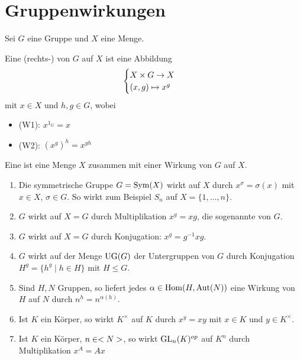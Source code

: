 \section{Gruppenwirkungen}

Sei $G$ eine Gruppe und $X$ eine Menge.

\begin{definition}
	Eine (rechts-) von $G$ auf $X$ ist eine Abbildung
	\begin{align}
		\begin{cases}
			X\times G\to X \\ (x,g)\mapsto x^g
		\end{cases}\notag
	\end{align}
	mit $x\in X$ und $h,g\in G$, wobei
	\begin{itemize}
		\item (W1): $x^{1_G}=x$
		\item (W2): $(x^g)^h=x^{gh}$
	\end{itemize}
	Eine  ist eine Menge $X$ zusammen mit einer Wirkung von $G$ auf $X$.
\end{definition}

\begin{example}
	\begin{enumerate}[label=(\alph*)]
		\item Die symmetrische Gruppe $G=\operatorname{Sym}(X)$ wirkt auf $X$ durch $x^\sigma=\sigma(x)$ mit $x\in X$, $\sigma\in G$. So wirkt zum Beispiel $S_n$ auf $X=\{1,...,n\}$.
		\item $G$ wirkt auf $X=G$ durch Multiplikation $x^g=xg$, die sogenannte  von $G$.
		\item $G$ wirkt auf $X=G$ durch Konjugation: $x^g=g^{-1}xg$.
		\item $G$ wirkt auf der Menge $\operatorname{UG}(G)$ der Untergruppen von $G$ durch Konjugation $H^g=\{h^g\mid h\in H\}$ mit $H\le G$.
		\item Sind $H,N$ Gruppen, so liefert jedes $\alpha\in\operatorname{Hom}(H,\operatorname{Aut}(N))$ eine Wirkung von $H$ auf $N$ durch $n^h=n^{\alpha(h)}$.
		\item Ist $K$ ein Körper, so wirkt $K^\times$ auf $K$ durch $x^y=xy$ mit $x\in K$ und $y\in K^\times$.
		\item Ist $K$ ein Körper, $n\in<N>$, so wirkt $\operatorname{GL}_n(K)^{op}$ auf $K^n$ durch Multiplikation $x^A=Ax$
	\end{enumerate}
\end{example}

